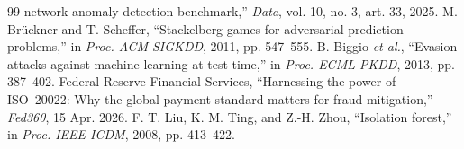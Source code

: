 \documentclass[conference]{IEEEtran}
\begin{document}
\begin{thebibliography}{99}
network anomaly detection benchmark,'' \emph{Data}, vol. 10, no. 3, art. 33,
2025.
M. Br\"uckner and T. Scheffer, ``Stackelberg games for adversarial prediction
problems,'' in \emph{Proc. ACM SIGKDD}, 2011, pp. 547--555.
B. Biggio \emph{et al.}, ``Evasion attacks against machine learning at test
time,'' in \emph{Proc. ECML PKDD}, 2013, pp. 387--402.
Federal Reserve Financial Services, ``Harnessing the power of ISO~20022: Why
the global payment standard matters for fraud mitigation,'' \emph{Fed360}, 15
Apr. 2026.
F. T. Liu, K. M. Ting, and Z.-H. Zhou, ``Isolation forest,'' in \emph{Proc.
IEEE ICDM}, 2008, pp. 413--422.
\end{thebibliography}
\end{document}
